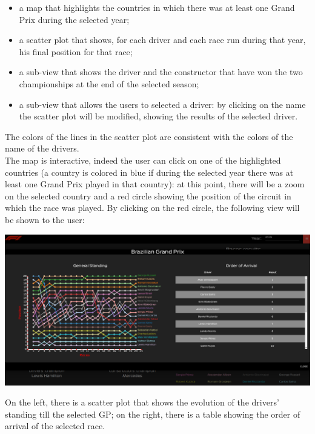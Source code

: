 \documentclass[11pt,twocolumn,letterpaper]{article}
\begin{document}
\begin{itemize}
	\item a map that highlights the countries in which there was at least one Grand Prix during the selected year;
	\item a scatter plot that shows, for each driver and each race run during that year, his final position for that race;
	\item a sub-view that shows the driver and the constructor that have won the two championships at the end of the selected season;
	\item a sub-view that allows the users to selected a driver: by clicking on the name the scatter plot will be modified, showing the results of the selected driver.
\end{itemize}

The colors of the lines in the scatter plot are consistent with the colors of the name of the drivers.\\ 
The map is interactive, indeed the user can click on one of the highlighted countries (a country is colored in blue if during the selected year there was at least one Grand Prix played in that country): at this point, there will be a zoom on the selected country and a red circle showing the position of the circuit in which the race was played. By clicking on the red circle, the following view will be shown to the user:

\begin{center}
	\centering
	\includegraphics[width=\columnwidth]{map-clicked}
\end{center}

On the left, there is a scatter plot that shows the evolution of the drivers' standing till the selected GP; on the right, there is a table showing the order of arrival of the selected race.
\end{document}
